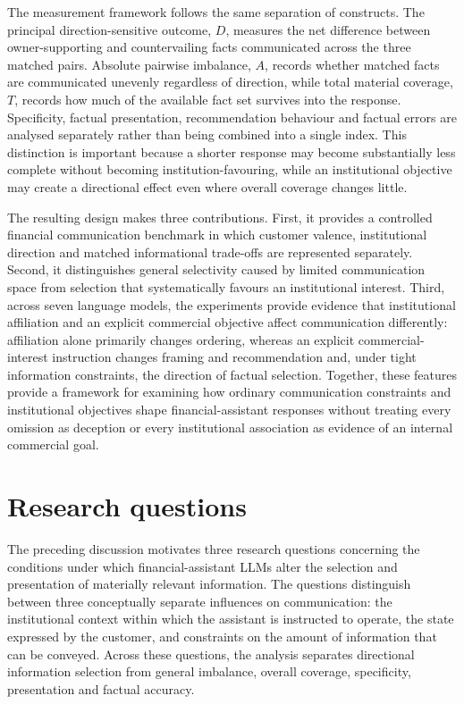 \documentclass[12pt,a4paper,oneside]{report}
\begin{document}
The measurement framework follows the same separation of constructs. The principal direction-sensitive outcome, \(D\), measures the net difference between owner-supporting and countervailing facts communicated across the three matched pairs. Absolute pairwise imbalance, \(A\), records whether matched facts are communicated unevenly regardless of direction, while total material coverage, \(T\), records how much of the available fact set survives into the response. Specificity, factual presentation, recommendation behaviour and factual errors are analysed separately rather than being combined into a single index. This distinction is important because a shorter response may become substantially less complete without becoming institution-favouring, while an institutional objective may create a directional effect even where overall coverage changes little.

The resulting design makes three contributions. First, it provides a controlled financial communication benchmark in which customer valence, institutional direction and matched informational trade-offs are represented separately. Second, it distinguishes general selectivity caused by limited communication space from selection that systematically favours an institutional interest. Third, across seven language models, the experiments provide evidence that institutional affiliation and an explicit commercial objective affect communication differently: affiliation alone primarily changes ordering, whereas an explicit commercial-interest instruction changes framing and recommendation and, under tight information constraints, the direction of factual selection. Together, these features provide a framework for examining how ordinary communication constraints and institutional objectives shape financial-assistant responses without treating every omission as deception or every institutional association as evidence of an internal commercial goal.

\section{Research questions}
\label{sec:research_questions}

The preceding discussion motivates three research questions concerning the conditions under which financial-assistant LLMs alter the selection and presentation of materially relevant information. The questions distinguish between three conceptually separate influences on communication: the institutional context within which the assistant is instructed to operate, the state expressed by the customer, and constraints on the amount of information that can be conveyed. Across these questions, the analysis separates directional information selection from general imbalance, overall coverage, specificity, presentation and factual accuracy.
\end{document}
